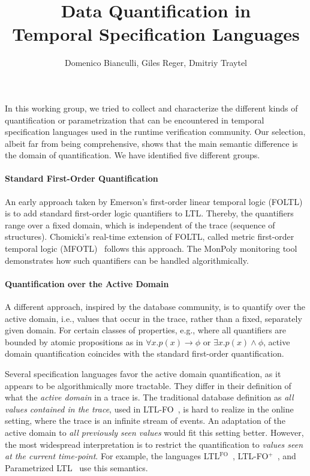 \documentclass{article}
\title{Data Quantification in\\ Temporal Specification Languages}
\author{Domenico Bianculli, Giles Reger, Dmitriy Traytel}
\begin{document}
\maketitle

In this working group, we tried to collect and characterize the different kinds of quantification or parametrization that can be encountered in temporal specification languages used in the runtime verification community.
Our selection, albeit far from being comprehensive, shows that the main semantic difference is the domain of quantification. We have identified five different groups.

\paragraph{Standard First-Order Quantification}

An early approach taken by Emerson's first-order linear temporal logic (FOLTL)~\cite{Emerson90} is to add standard first-order logic quantifiers to LTL. Thereby, the quantifiers range over a fixed domain, which is independent of the trace (sequence of structures). Chomicki's real-time extension of FOLTL, called metric first-order temporal logic (MFOTL)~\cite{Chomicki95} follows this approach. The MonPoly monitoring tool~\cite{BasinKMZ15} demonstrates how such quantifiers can be handled algorithmically. 

\paragraph{Quantification over the Active Domain}

A different approach, inspired by the database community, is to quantify over the active domain, i.e., values that occur in the trace, rather than a fixed, separately given domain. For certain classes of properties, e.g., where all quantifiers are bounded by atomic propositions as in $\forall x. p(x) \rightarrow \phi$ or $\exists x. p(x) \land \phi$, active domain quantification coincides with the standard first-order quantification.

Several specification languages favor the active domain quantification, as it appears to be algorithmically more tractable. They differ in their definition of what the \emph{active domain} in a trace is.
%
The traditional database definition as \emph{all values contained in the trace},
used in LTL-FO~\cite{DeutschSVZ06}, is hard to realize in the online setting,
where the trace is an infinite stream of events. An adaptation of the active
domain to \emph{all previously seen values} would fit this setting better. However, the most widespread interpretation is to restrict the quantification to \emph{values seen at the current time-point}. For example, the languages LTL$^\text{FO}$~\cite{BauerKV15},
LTL-FO$^+$~\cite{HalleV08}, and
Parametrized LTL~\cite{Stolz10}
use this semantics.
\end{document}
